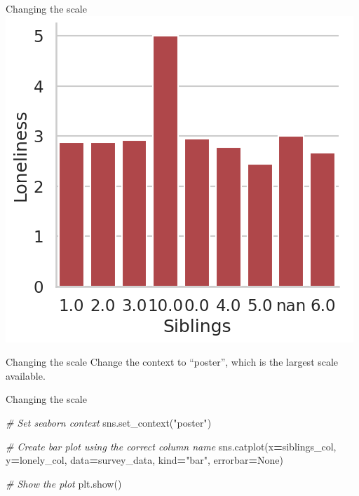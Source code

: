 \documentclass[
  ignorenonframetext,
]{beamer}
\newenvironment{Shaded}{\begin{snugshade}}{\end{snugshade}}
\newcommand{\CommentTok}[1]{\textcolor[rgb]{0.56,0.35,0.01}{\textit{#1}}}
\newcommand{\NormalTok}[1]{#1}
\newcommand{\OperatorTok}[1]{\textcolor[rgb]{0.81,0.36,0.00}{\textbf{#1}}}
\newcommand{\StringTok}[1]{\textcolor[rgb]{0.31,0.60,0.02}{#1}}
\newcommand{\VariableTok}[1]{\textcolor[rgb]{0.00,0.00,0.00}{#1}}
\begin{document}
\begin{frame}{Changing the scale}
\label{changing-the-scale-13}
\includegraphics{../images/im301.png}
\end{frame}

\begin{frame}{Changing the scale}
\label{changing-the-scale-14}
Change the context to ``poster'', which is the largest scale available.
\end{frame}

\begin{frame}[fragile]{Changing the scale}
\label{changing-the-scale-15}

\begin{Shaded}
\begin{Highlighting}[]
\CommentTok{\# Set seaborn context}
\NormalTok{sns.set\_context(}\StringTok{"poster"}\NormalTok{)}

\CommentTok{\# Create bar plot using the correct column name}
\NormalTok{sns.catplot(x}\OperatorTok{=}\NormalTok{siblings\_col, y}\OperatorTok{=}\NormalTok{lonely\_col, }
\NormalTok{            data}\OperatorTok{=}\NormalTok{survey\_data, kind}\OperatorTok{=}\StringTok{"bar"}\NormalTok{, errorbar}\OperatorTok{=}\VariableTok{None}\NormalTok{)}

\CommentTok{\# Show the plot}
\NormalTok{plt.show()}
\end{Highlighting}
\end{Shaded}
\end{frame}
\end{document}

